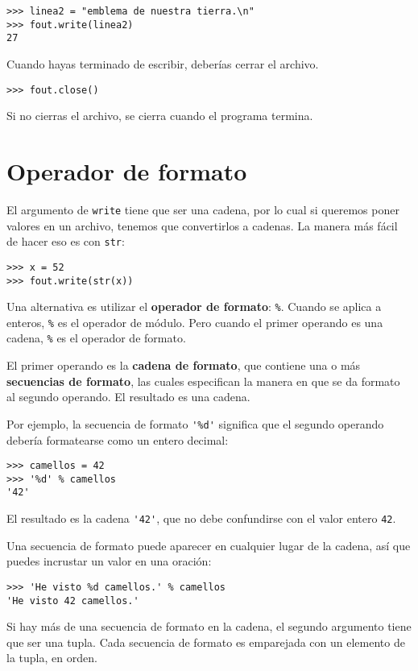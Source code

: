 \documentclass[10pt]{book}
\begin{document}
\begin{verbatim}
>>> linea2 = "emblema de nuestra tierra.\n"
>>> fout.write(linea2)
27
\end{verbatim}
%
Cuando hayas terminado de escribir, deberías cerrar el archivo.

\begin{verbatim}
>>> fout.close()
\end{verbatim}
%
%
Si no cierras el archivo, se cierra cuando el
programa termina.


\section{Operador de formato}

El argumento de {\tt write} tiene que ser una cadena, por lo cual si queremos
poner valores en un archivo, tenemos que convertirlos a
cadenas.  La manera más fácil de hacer eso es con {\tt str}:

\begin{verbatim}
>>> x = 52
>>> fout.write(str(x))
\end{verbatim}
%
Una alternativa es utilizar el {\bf operador de formato}: {\tt \%}.  Cuando
se aplica a enteros, {\tt \%} es el operador de módulo.  Pero
cuando el primer operando es una cadena, {\tt \%} es el operador de formato.

El primer operando es la {\bf cadena de formato}, que contiene
una o más {\bf secuencias de formato}, las cuales
especifican la manera en que
se da formato al segundo operando.  El resultado es una cadena.

Por ejemplo, la secuencia de formato \verb"'%d'" significa que
el segundo operando debería formatearse como un entero
decimal:

\begin{verbatim}
>>> camellos = 42
>>> '%d' % camellos
'42'
\end{verbatim}
%
El resultado es la cadena \verb"'42'", que no debe confundirse
con el valor entero {\tt 42}.

Una secuencia de formato puede aparecer en cualquier lugar de la cadena,
así que puedes incrustar un valor en una oración:

\begin{verbatim}
>>> 'He visto %d camellos.' % camellos
'He visto 42 camellos.'
\end{verbatim}
%
Si hay más de una secuencia de formato en la cadena,
el segundo argumento tiene que ser una tupla.  Cada secuencia de formato es
emparejada con un elemento de la tupla, en orden.
\end{document}
